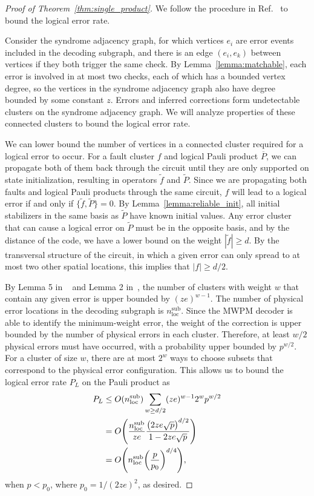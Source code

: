 \documentclass[prx,twocolumn,secnumarabic,balancelastpage,amsmath,amssymb,longbibliography]{revtex4-2}
\newcommand{\lop}[1]{\overline{#1}}
\newcommand{\plogical}{P_{L}}
\begin{document}
\begin{proof}[Proof of Theorem~\ref{thm:single_product}]
We follow the procedure in Ref.~\cite{gottesman2013fault} to bound the logical error rate.

Consider the syndrome adjacency graph, for which vertices $e_i$ are error events included in the decoding subgraph, and there is an edge $(e_i,e_k)$ between vertices if they both trigger the same check.
%
By Lemma~\ref{lemma:matchable}, each error is involved in at most two checks, each of which has a bounded vertex degree, so the vertices in the syndrome adjacency graph also have degree bounded by some constant $z$.
%
Errors and inferred corrections form undetectable clusters on the syndrome adjacency graph.
%
We will analyze properties of these connected clusters to bound the logical error rate.

We can lower bound the number of vertices in a connected cluster required for a logical error to occur.
%
For a fault cluster $f$ and logical Pauli product $\lop{P}$, we can propagate both of them back through the circuit until they are only supported on state initialization, resulting in operators $\tilde{f}$ and $\tilde{P}$.
%
Since we are propagating both faults and logical Pauli products through the same circuit, $f$ will lead to a logical error if and only if $\{\tilde{f},\tilde{P}\}=0$.
%
By Lemma~\ref{lemma:reliable_init}, all initial stabilizers in the same basis as $\tilde{P}$ have known initial values.
%
Any error cluster that can cause a logical error on $\tilde{P}$ must be in the opposite basis, and by the distance of the code, we have a lower bound on the weight $|\tilde{f}|\geq d$.
%
By the transversal structure of the circuit, in which a given error can only spread to at most two other spatial locations, this implies that $|f|\geq d/2$.

By Lemma 5 in ~\cite{aliferis2007accuracy} and Lemma 2 in~\cite{gottesman2013fault}, the number of clusters with weight $w$ that contain any given error is upper bounded by $(ze)^{w-1}$.
%
The number of physical error locations in the decoding subgraph is $n^{\mathrm{sub}}_{\mathrm{loc}}$.
%
Since the MWPM decoder is able to identify the minimum-weight error, the weight of the correction is upper bounded by the number of physical errors in each cluster.
%
Therefore, at least $w/2$ physical errors must have occurred, with a probability upper bounded by $p^{w/2}$.
%
For a cluster of size $w$, there are at most $2^w$ ways to choose subsets that correspond to the physical error configuration.
%
This allows us to bound the logical error rate $\plogical$ on the Pauli product as
\begin{align}
\plogical &\leq O(n^{\mathrm{sub}}_{\mathrm{loc}}) \sum_{w\geq d/2}(ze)^{w-1} 2^w p^{w/2} \nonumber\\&= O\qty(\frac{n^{\mathrm{sub}}_{\mathrm{loc}}}{ze} \frac{\left( 2ze \sqrt{ p } \right)^{d/2}}{1-2ze\sqrt{ p }})\nonumber\\
&=O\qty(n^{\mathrm{sub}}_{\mathrm{loc}}\qty(\frac{p}{p_0})^{d/4}),
\end{align}
when $p < p_0$, where $p_0=1/(2ze)^2$, as desired.
\end{proof}
\end{document}
